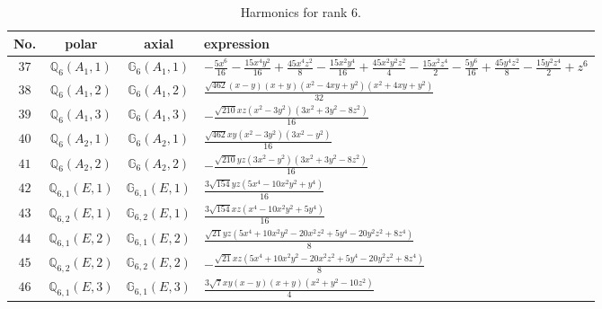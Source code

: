 \documentclass[fleqn,8pt,landscape]{jsarticle}
\begin{document}
\begin{table}[ht!]
\begin{center}
\caption{Harmonics for rank 6.}
\renewcommand{\arraystretch}{1.3}
\begin{tabular}{cccl} \hline \hline
No. & polar & axial & expression \\ \hline
$ 37 $ & $ \mathbb{Q}_{6}(A_{1},1) $ & $ \mathbb{G}_{6}(A_{1},1) $ & $ - \frac{5 x^{6}}{16} - \frac{15 x^{4} y^{2}}{16} + \frac{45 x^{4} z^{2}}{8} - \frac{15 x^{2} y^{4}}{16} + \frac{45 x^{2} y^{2} z^{2}}{4} - \frac{15 x^{2} z^{4}}{2} - \frac{5 y^{6}}{16} + \frac{45 y^{4} z^{2}}{8} - \frac{15 y^{2} z^{4}}{2} + z^{6} $ \\
$ 38 $ & $ \mathbb{Q}_{6}(A_{1},2) $ & $ \mathbb{G}_{6}(A_{1},2) $ & $ \frac{\sqrt{462} \left(x - y\right) \left(x + y\right) \left(x^{2} - 4 x y + y^{2}\right) \left(x^{2} + 4 x y + y^{2}\right)}{32} $ \\
$ 39 $ & $ \mathbb{Q}_{6}(A_{1},3) $ & $ \mathbb{G}_{6}(A_{1},3) $ & $ - \frac{\sqrt{210} x z \left(x^{2} - 3 y^{2}\right) \left(3 x^{2} + 3 y^{2} - 8 z^{2}\right)}{16} $ \\
$ 40 $ & $ \mathbb{Q}_{6}(A_{2},1) $ & $ \mathbb{G}_{6}(A_{2},1) $ & $ \frac{\sqrt{462} x y \left(x^{2} - 3 y^{2}\right) \left(3 x^{2} - y^{2}\right)}{16} $ \\
$ 41 $ & $ \mathbb{Q}_{6}(A_{2},2) $ & $ \mathbb{G}_{6}(A_{2},2) $ & $ - \frac{\sqrt{210} y z \left(3 x^{2} - y^{2}\right) \left(3 x^{2} + 3 y^{2} - 8 z^{2}\right)}{16} $ \\
$ 42 $ & $ \mathbb{Q}_{6,1}(E,1) $ & $ \mathbb{G}_{6,1}(E,1) $ & $ \frac{3 \sqrt{154} y z \left(5 x^{4} - 10 x^{2} y^{2} + y^{4}\right)}{16} $ \\
$ 43 $ & $ \mathbb{Q}_{6,2}(E,1) $ & $ \mathbb{G}_{6,2}(E,1) $ & $ \frac{3 \sqrt{154} x z \left(x^{4} - 10 x^{2} y^{2} + 5 y^{4}\right)}{16} $ \\
$ 44 $ & $ \mathbb{Q}_{6,1}(E,2) $ & $ \mathbb{G}_{6,1}(E,2) $ & $ \frac{\sqrt{21} y z \left(5 x^{4} + 10 x^{2} y^{2} - 20 x^{2} z^{2} + 5 y^{4} - 20 y^{2} z^{2} + 8 z^{4}\right)}{8} $ \\
$ 45 $ & $ \mathbb{Q}_{6,2}(E,2) $ & $ \mathbb{G}_{6,2}(E,2) $ & $ - \frac{\sqrt{21} x z \left(5 x^{4} + 10 x^{2} y^{2} - 20 x^{2} z^{2} + 5 y^{4} - 20 y^{2} z^{2} + 8 z^{4}\right)}{8} $ \\
$ 46 $ & $ \mathbb{Q}_{6,1}(E,3) $ & $ \mathbb{G}_{6,1}(E,3) $ & $ \frac{3 \sqrt{7} x y \left(x - y\right) \left(x + y\right) \left(x^{2} + y^{2} - 10 z^{2}\right)}{4} $ \\

\end{tabular}
\end{center}
\end{table}
\end{document}
